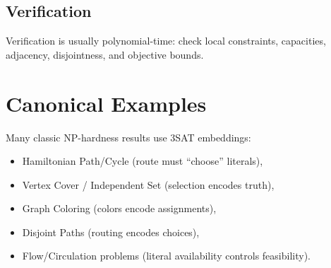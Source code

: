\documentclass[11pt]{article}
\begin{document}
\subsection*{Verification}
Verification is usually polynomial-time: check local constraints, capacities, adjacency, disjointness, and objective bounds.

\section{Canonical Examples}
Many classic NP-hardness results use 3SAT embeddings:
\begin{itemize}[itemsep=2pt]
  \item Hamiltonian Path/Cycle (route must ``choose'' literals),
  \item Vertex Cover / Independent Set (selection encodes truth),
  \item Graph Coloring (colors encode assignments),
  \item Disjoint Paths (routing encodes choices),
  \item Flow/Circulation problems (literal availability controls feasibility).
\end{itemize}
\end{document}
